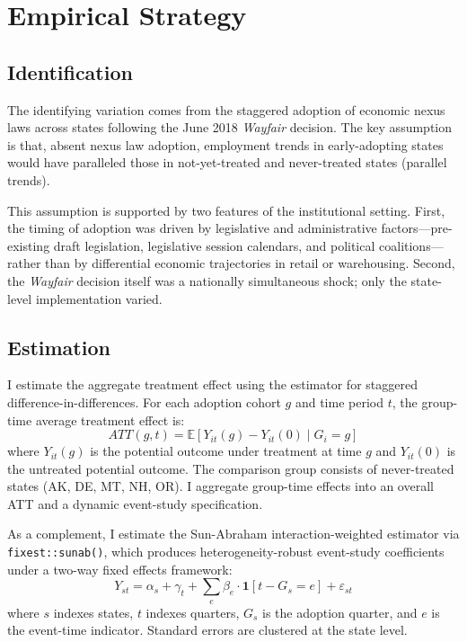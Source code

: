 \documentclass[12pt]{article}
\newcommand{\E}{\mathbb{E}}
\begin{document}
\section{Empirical Strategy}
\label{sec:strategy}

\subsection{Identification}

The identifying variation comes from the staggered adoption of economic nexus laws across states following the June 2018 \textit{Wayfair} decision. The key assumption is that, absent nexus law adoption, employment trends in early-adopting states would have paralleled those in not-yet-treated and never-treated states (parallel trends).

This assumption is supported by two features of the institutional setting. First, the timing of adoption was driven by legislative and administrative factors---pre-existing draft legislation, legislative session calendars, and political coalitions---rather than by differential economic trajectories in retail or warehousing. Second, the \textit{Wayfair} decision itself was a nationally simultaneous shock; only the state-level implementation varied.

\subsection{Estimation}

I estimate the aggregate treatment effect using the \citet{callaway2021} estimator for staggered difference-in-differences. For each adoption cohort $g$ and time period $t$, the group-time average treatment effect is:
\begin{equation}
  ATT(g,t) = \E[Y_{it}(g) - Y_{it}(0) \mid G_i = g]
\end{equation}
where $Y_{it}(g)$ is the potential outcome under treatment at time $g$ and $Y_{it}(0)$ is the untreated potential outcome. The comparison group consists of never-treated states (AK, DE, MT, NH, OR). I aggregate group-time effects into an overall ATT and a dynamic event-study specification.

As a complement, I estimate the Sun-Abraham interaction-weighted estimator \citep{sun2021} via \texttt{fixest::sunab()}, which produces heterogeneity-robust event-study coefficients under a two-way fixed effects framework:
\begin{equation}
  Y_{st} = \alpha_s + \gamma_t + \sum_{e} \beta_e \cdot \mathbf{1}[t - G_s = e] + \varepsilon_{st}
\end{equation}
where $s$ indexes states, $t$ indexes quarters, $G_s$ is the adoption quarter, and $e$ is the event-time indicator. Standard errors are clustered at the state level.
\end{document}
